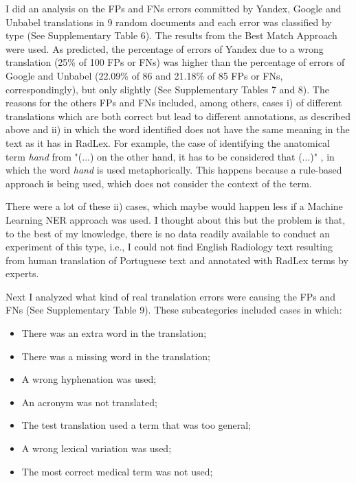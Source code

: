 I did an analysis on the FPs and FNs errors committed by Yandex, Google and Unbabel translations in 9 random documents and each error was classified by type (See Supplementary Table 6). The results from the Best Match Approach were used. As predicted, the percentage of errors of Yandex due to a wrong translation (25\% of 100 FPs or FNs) was higher than the percentage of errors of Google and Unbabel (22.09\% of 86 and 21.18\% of 85 FPs or FNs, correspondingly), but only slightly (See Supplementary Tables 7 and 8). The reasons for the others FPs and FNs included, among others, cases i) of different translations which are both correct but lead to different annotations, as described above and ii) in which the word identified does not have the same meaning in the text as it has in RadLex. For example, the case of identifying the anatomical term \textit{hand} from "(...) on the other hand, it has to be considered that (...)" , in which the word \textit{hand} is used metaphorically. This happens because a rule-based approach is being used, which does not consider the context of the term. 

There were a lot of these ii) cases, which maybe would happen less if a Machine Learning NER approach was used. I thought about this but the problem is that, to the best of my knowledge, there is no data  readily available to conduct an experiment of this type, i.e., I could not find English Radiology text resulting from human translation of Portuguese text and annotated with RadLex terms by experts. 

Next I analyzed what kind of real translation errors were causing the FPs and FNs (See Supplementary Table 9). These subcategories included cases in which:

\begin{itemize}
	\item There was an extra word in the translation;
	\item There was a missing word in the translation;
	\item A wrong hyphenation was used;
	\item An acronym was not translated; 
	\item The test translation used a term that was too general;
	\item A wrong lexical variation was used;
	\item The most correct medical term was not used;
\end{itemize}

